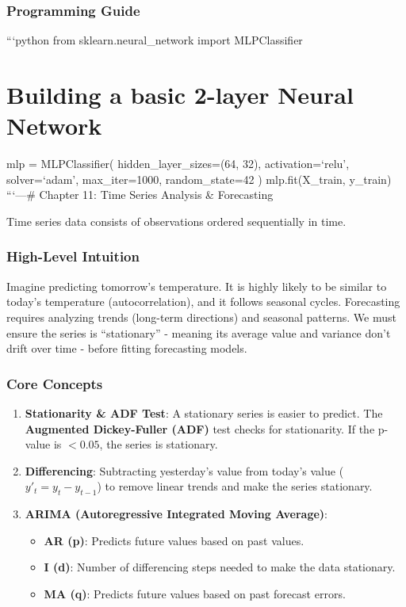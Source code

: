 \subsubsection{Programming Guide}\label{programming-guide-9}

```python from sklearn.neural\_network import MLPClassifier

\section{Building a basic 2-layer Neural
Network}\label{building-a-basic-2-layer-neural-network}

mlp = MLPClassifier( hidden\_layer\_sizes=(64, 32), activation=`relu',
solver=`adam', max\_iter=1000, random\_state=42 ) mlp.fit(X\_train,
y\_train) ```\n\n---\n\n\# Chapter 11: Time Series Analysis \&
Forecasting

Time series data consists of observations ordered sequentially in time.

\subsubsection{High-Level Intuition}\label{high-level-intuition-10}

Imagine predicting tomorrow's temperature. It is highly likely to be
similar to today's temperature (autocorrelation), and it follows
seasonal cycles. Forecasting requires analyzing trends (long-term
directions) and seasonal patterns. We must ensure the series is
``stationary'' - meaning its average value and variance don't drift over
time - before fitting forecasting models.

\subsubsection{Core Concepts}\label{core-concepts-5}

\begin{enumerate}
\def\labelenumi{\arabic{enumi}.}
\tightlist
\item
  \textbf{Stationarity \& ADF Test}: A stationary series is easier to
  predict. The \textbf{Augmented Dickey-Fuller (ADF)} test checks for
  stationarity. If the p-value is \(< 0.05\), the series is stationary.
\item
  \textbf{Differencing}: Subtracting yesterday's value from today's
  value (\(y'_t = y_t - y_{t-1}\)) to remove linear trends and make the
  series stationary.
\item
  \textbf{ARIMA (Autoregressive Integrated Moving Average)}:

  \begin{itemize}
  \tightlist
  \item
    \textbf{AR (p)}: Predicts future values based on past values.
  \item
    \textbf{I (d)}: Number of differencing steps needed to make the data
    stationary.
  \item
    \textbf{MA (q)}: Predicts future values based on past forecast
    errors.
  \end{itemize}
\end{enumerate}

